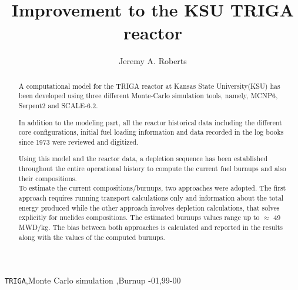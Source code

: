 \documentclass[review,number,sort&compress,12pt]{elsarticle}
\begin{document}
\begin{frontmatter}



\title{Improvement to the KSU TRIGA reactor}


\author{Jeremy A. Roberts}
\address{Department of Mechanical and Nuclear Engineering, Kansas State University, Manhattan, KS 66506, USA}

\begin{abstract}
	A computational model for the TRIGA reactor at Kansas State University(KSU) has been developed using three 
	different Monte-Carlo simulation tools, namely, MCNP6, Serpent2 and SCALE-6.2.
	
	In addition to the modeling part, all the reactor historical data including the different core configurations, initial fuel loading information and data recorded in the log books since 1973 were reviewed and digitized.
	
	Using this model and the reactor data, a depletion sequence has been established throughout the entire 
	operational history to compute the current fuel burnups and also their compositions.\\
	To estimate the current compositions/burnups, two approaches were adopted. The first approach requires running transport calculations only and information about the total energy produced while the other approach involves depletion calculations, that solves explicitly for nuclides compositions. The estimated burnups values range up to $\approx$ 49 MWD/kg. The bias between both approaches is calculated and reported in the results along with the values of the computed burnups.
	
	
\end{abstract}

\begin{keyword}
	\texttt{TRIGA}\sep Monte Carlo simulation \sep Burnup 
	-01\sep  99-00
\end{keyword}
\end{frontmatter}
\end{document}
